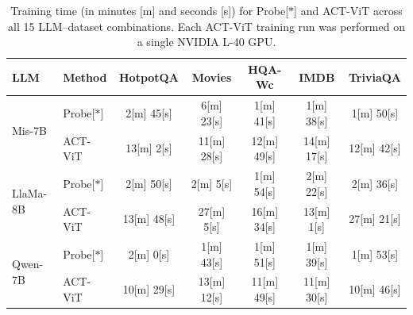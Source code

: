 \begin{table}[t]
\centering
\caption{Training time (in minutes [m] and seconds [s]) for Probe[$*$] and ACT-ViT across all 15
LLM--dataset combinations. Each ACT-ViT training run was performed on a single NVIDIA L-40
GPU.}
\label{tab:runtime}
\renewcommand{\arraystretch}{1.15}
\small
\begin{tabular}{|l|l|c|c|c|c|c|}
\hline
LLM & Method & HotpotQA & Movies & HQA-Wc & IMDB & TriviaQA \\
\hline
\multirow{2}{*}{Mis-7B} & Probe[$*$] & 2[m] 45[s] & 6[m] 23[s] & 1[m] 41[s] & 1[m] 38[s] & 1[m] 50[s] \\
\cline{2-7}
                       & ACT-ViT    & 13[m] 2[s] & 11[m] 28[s] & 12[m] 49[s] & 14[m] 17[s] & 12[m] 42[s] \\
\hline
\multirow{2}{*}{LlaMa-8B} & Probe[$*$] & 2[m] 50[s] & 2[m] 5[s] & 1[m] 54[s] & 2[m] 22[s] & 2[m] 36[s] \\
\cline{2-7}
                          & ACT-ViT    & 13[m] 48[s] & 27[m] 5[s] & 16[m] 34[s] & 13[m] 1[s] & 27[m] 21[s] \\
\hline
\multirow{2}{*}{Qwen-7B} & Probe[$*$] & 2[m] 0[s] & 1[m] 43[s] & 1[m] 51[s] & 1[m] 39[s] & 1[m] 53[s] \\
\cline{2-7}
                         & ACT-ViT    & 10[m] 29[s] & 13[m] 12[s] & 11[m] 49[s] & 11[m] 30[s] & 10[m] 46[s] \\
\hline
\end{tabular}
\end{table}
